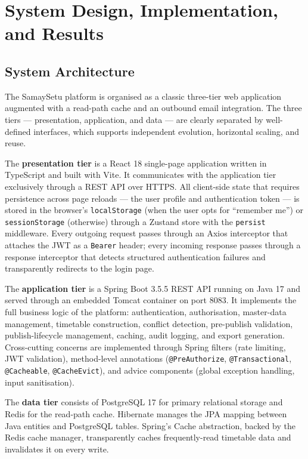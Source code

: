 \newpage
\chapter{System Design, Implementation, and Results}

\section{System Architecture}

The SamaySetu platform is organised as a classic three-tier web application augmented with a read-path cache and an outbound email integration. The three tiers --- presentation, application, and data --- are clearly separated by well-defined interfaces, which supports independent evolution, horizontal scaling, and reuse.

The \textbf{presentation tier} is a React 18 single-page application written in TypeScript and built with Vite. It communicates with the application tier exclusively through a REST API over HTTPS. All client-side state that requires persistence across page reloads --- the user profile and authentication token --- is stored in the browser's \texttt{localStorage} (when the user opts for ``remember me'') or \texttt{sessionStorage} (otherwise) through a Zustand store with the \texttt{persist} middleware. Every outgoing request passes through an Axios interceptor that attaches the JWT as a \texttt{Bearer} header; every incoming response passes through a response interceptor that detects structured authentication failures and transparently redirects to the login page.

The \textbf{application tier} is a Spring Boot 3.5.5 REST API running on Java 17 and served through an embedded Tomcat container on port 8083. It implements the full business logic of the platform: authentication, authorisation, master-data management, timetable construction, conflict detection, pre-publish validation, publish-lifecycle management, caching, audit logging, and export generation. Cross-cutting concerns are implemented through Spring filters (rate limiting, JWT validation), method-level annotations (\texttt{@PreAuthorize}, \texttt{@Transactional}, \texttt{@Cacheable}, \texttt{@CacheEvict}), and advice components (global exception handling, input sanitisation).

The \textbf{data tier} consists of PostgreSQL 17 for primary relational storage and Redis for the read-path cache. Hibernate manages the JPA mapping between Java entities and PostgreSQL tables. Spring's Cache abstraction, backed by the Redis cache manager, transparently caches frequently-read timetable data and invalidates it on every write.

